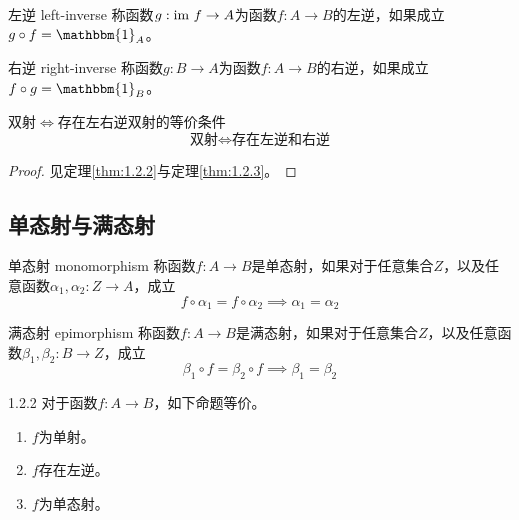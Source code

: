 \begin{definition}{左逆 left-inverse}
	称函数$g:\text{im } f\to A$为函数$f:A\to B$的左逆，如果成立$g\circ f=\mathbbm{1}_A$。
\end{definition}

\begin{definition}{右逆 right-inverse}
	称函数$g:B\to A$为函数$f:A\to B$的右逆，如果成立$f\circ g=\mathbbm{1}_B$。
\end{definition}

\begin{proposition}{双射$\iff$存在左右逆}{双射的等价条件}
	$$
	\text{双射}\iff\text{存在左逆和右逆}
	$$
\end{proposition}

\begin{proof}
	见定理\ref{thm:1.2.2}与定理\ref{thm:1.2.3}。
\end{proof}

\subsection{单态射与满态射}

\begin{definition}{单态射 monomorphism}
	称函数$f:A\to B$是单态射，如果对于任意集合$Z$，以及任意函数$\alpha_1,\alpha_2:Z\to A$，成立
	$$
	f\circ \alpha_1=f\circ \alpha_2\implies\alpha_1=\alpha_2
	$$
\end{definition}

\begin{definition}{满态射 epimorphism}
	称函数$f:A\to B$是满态射，如果对于任意集合$Z$，以及任意函数$\beta_1,\beta_2:B\to Z$，成立
	$$
	\beta_1\circ f=\beta_2\circ f\implies \beta_1=\beta_2
	$$
\end{definition}

\begin{theorem}{}{1.2.2}
	对于函数$f:A\to B$，如下命题等价。
	\begin{enumerate}
		\item $f$为单射。
		\item $f$存在左逆。
		\item $f$为单态射。
	\end{enumerate}
\end{theorem}

